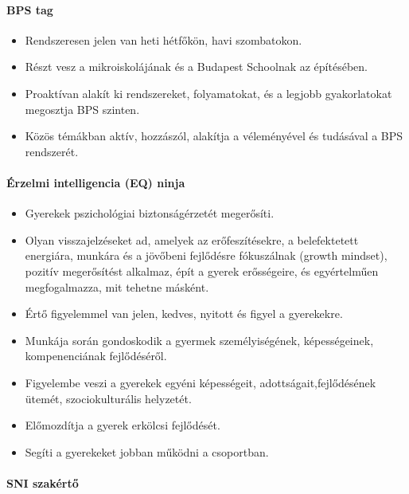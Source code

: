 \paragraph{BPS tag}

\begin{itemize}

  \item
        Rendszeresen jelen van heti hétfőkön, havi szombatokon.
  \item
        Részt vesz a mikroiskolájának és a Budapest Schoolnak az építésében.
  \item
        Proaktívan alakít ki rendszereket, folyamatokat, és a legjobb
        gyakorlatokat megosztja BPS szinten.
  \item
        Közös témákban aktív, hozzászól, alakítja a véleményével és tudásával
        a BPS rendszerét.
\end{itemize}

\paragraph{Érzelmi intelligencia (EQ)
  ninja}

\begin{itemize}

  \item
        Gyerekek pszichológiai biztonságérzetét megerősíti.
  \item
        Olyan visszajelzéseket ad, amelyek az erőfeszítésekre, a belefektetett
        energiára, munkára és a jövőbeni fejlődésre fókuszálnak (growth
        mindset), pozitív megerősítést alkalmaz, épít a gyerek erősségeire, és
        egyértelműen megfogalmazza, mit tehetne másként.
  \item
        Értő figyelemmel van jelen, kedves, nyitott és figyel a gyerekekre.
  \item Munkája során gondoskodik a gyermek személyiségének, képességeinek,
        kompenenciának fejlődéséről.
  \item Figyelembe veszi a gyerekek egyéni képességeit,
        adottságait,fejlődésének ütemét, szociokulturális helyzetét.
  \item Előmozdítja a gyerek erkölcsi fejlődését.
  \item Segíti a gyerekeket jobban működni a csoportban.


\end{itemize}

\paragraph{SNI szakértő}

